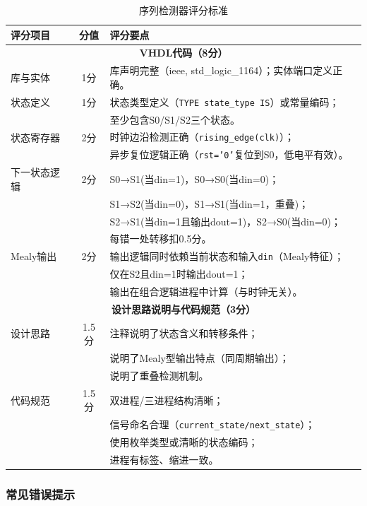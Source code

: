 \begin{table}[h!]
\centering
\caption{序列检测器评分标准}
\begin{tabular}{|l|c|p{10cm}|}
\hline
\textbf{评分项目} & \textbf{分值} & \textbf{评分要点} \\
\hline
\multicolumn{3}{|c|}{\textbf{VHDL代码（8分）}} \\
\hline
库与实体 & 1分 &
库声明完整（ieee, std\_logic\_1164）；实体端口定义正确。\\
\hline
状态定义 & 1分 &
状态类型定义（\texttt{TYPE state\_type IS}）或常量编码；\\
&&至少包含S0/S1/S2三个状态。\\
\hline
状态寄存器 & 2分 &
时钟边沿检测正确（\texttt{rising\_edge(clk)}）；\\
&&异步复位逻辑正确（\texttt{rst='0'}复位到S0，低电平有效）。\\
\hline
下一状态逻辑 & 2分 &
S0→S1(当din=1)，S0→S0(当din=0)；\\
&&S1→S2(当din=0)，S1→S1(当din=1，重叠)；\\
&&S2→S1(当din=1且输出dout=1)，S2→S0(当din=0)；\\
&&每错一处转移扣0.5分。\\
\hline
Mealy输出 & 2分 &
输出逻辑同时依赖当前状态和输入\texttt{din}（Mealy特征）；\\
&&仅在S2且din=1时输出dout=1；\\
&&输出在组合逻辑进程中计算（与时钟无关）。\\
\hline
\multicolumn{3}{|c|}{\textbf{设计思路说明与代码规范（3分）}} \\
\hline
设计思路 & 1.5分 &
注释说明了状态含义和转移条件；\\
&&说明了Mealy型输出特点（同周期输出）；\\
&&说明了重叠检测机制。\\
\hline
代码规范 & 1.5分 &
双进程/三进程结构清晰；\\
&&信号命名合理（\texttt{current\_state/next\_state}）；\\
&&使用枚举类型或清晰的状态编码；\\
&&进程有标签、缩进一致。\\
\hline
\end{tabular}
\end{table}

\subsubsection*{常见错误提示}

